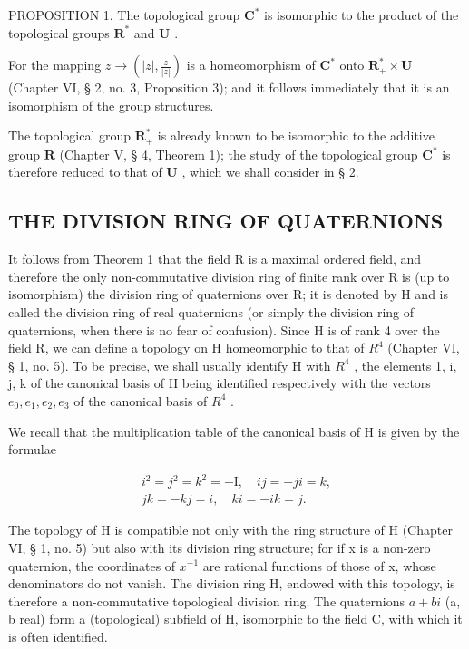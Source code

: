 PROPOSITION 1. The topological group \(\mathbf{C}^*\) is isomorphic to the product of the topological groups \(\mathbf{R}^*\) and \(\mathbf{U}\) .

For the mapping \(z \to \left( |z|, \frac{z}{|z|} \right)\) is a homeomorphism of \(\mathbf{C}^*\) onto \(\mathbf{R}_+^* \times \mathbf{U}\) (Chapter VI, § 2, no. 3, Proposition 3); and it follows immediately that it is an isomorphism of the group structures.

The topological group \(\mathbf{R}_{+}^{*}\) is already known to be isomorphic to the additive group \(\mathbf{R}\) (Chapter V, § 4, Theorem 1); the study of the topological group \(\mathbf{C}^{*}\) is therefore reduced to that of \(\mathbf{U}\) , which we shall consider in § 2.

\subsection{THE DIVISION RING OF QUATERNIONS}

It follows from Theorem 1 that the field R is a maximal ordered field, and therefore the only non-commutative division ring of finite rank over R is (up to isomorphism) the division ring of quaternions over R; it is denoted by H and is called the division ring of real quaternions (or simply the division ring of quaternions, when there is no fear of confusion). Since H is of rank 4 over the field R, we can define a topology on H homeomorphic to that of \(R^{4}\) (Chapter VI, § 1, no. 5). To be precise, we shall usually identify H with \(R^{4}\) , the elements 1, i, j, k of the canonical basis of H being identified respectively with the vectors \(e_{0}, e_{1}, e_{2}, e_{3}\) of the canonical basis of \(R^{4}\) .

We recall that the multiplication table of the canonical basis of H is given by the formulae

\[
\begin{array}{c} i ^ {2} = j ^ {2} = k ^ {2} = - \mathrm{I}, \quad i j = - j i = k, \\ j k = - k j = i, \quad k i = - i k = j. \end{array}
\]

The topology of H is compatible not only with the ring structure of H (Chapter VI, § 1, no. 5) but also with its division ring structure; for if x is a non-zero quaternion, the coordinates of \(x^{-1}\) are rational functions of those of x, whose denominators do not vanish. The division ring H, endowed with this topology, is therefore a non-commutative topological division ring. The quaternions \(a + bi\) (a, b real) form a (topological) subfield of H, isomorphic to the field C, with which it is often identified.


